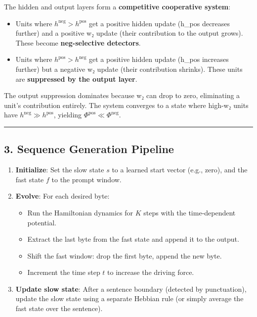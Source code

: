 \documentclass[
  11pt,
  a4paper,
]{article}
\providecommand{\tightlist}{%
  \setlength{\itemsep}{0pt}\setlength{\parskip}{0pt}}
\begin{document}
The hidden and output layers form a \textbf{competitive cooperative
system}:

\begin{itemize}
\tightlist
\item
  Units where \(h^{\text{neg}} > h^{\text{pos}}\) get a positive hidden
  update (h\_pos decreases further) and a positive w₂ update (their
  contribution to the output grows). These become \textbf{neg-selective
  detectors}.
\item
  Units where \(h^{\text{pos}} > h^{\text{neg}}\) get a positive hidden
  update (h\_pos increases further) but a negative w₂ update (their
  contribution shrinks). These units are \textbf{suppressed by the
  output layer}.
\end{itemize}

The output suppression dominates because w₂ can drop to zero,
eliminating a unit's contribution entirely. The system converges to a
state where high-w₂ units have \(h^{\text{neg}} \gg h^{\text{pos}}\),
yielding \(\Phi^{\text{pos}} \ll \Phi^{\text{neg}}\).

\begin{center}\rule{0.5\linewidth}{0.5pt}\end{center}

\subsection{3. Sequence Generation
Pipeline}\label{sequence-generation-pipeline}

\begin{enumerate}
\def\labelenumi{\arabic{enumi}.}
\tightlist
\item
  \textbf{Initialize}: Set the slow state \(s\) to a learned start
  vector (e.g., zero), and the fast state \(f\) to the prompt window.
\item
  \textbf{Evolve}: For each desired byte:

  \begin{itemize}
  \tightlist
  \item
    Run the Hamiltonian dynamics for \(K\) steps with the time‑dependent
    potential.
  \item
    Extract the last byte from the fast state and append it to the
    output.
  \item
    Shift the fast window: drop the first byte, append the new byte.
  \item
    Increment the time step \(t\) to increase the driving force.
  \end{itemize}
\item
  \textbf{Update slow state}: After a sentence boundary (detected by
  punctuation), update the slow state using a separate Hebbian rule (or
  simply average the fast state over the sentence).
\end{enumerate}
\end{document}
